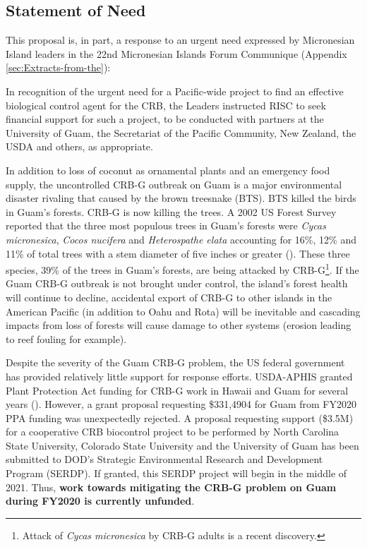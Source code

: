 \documentclass[12pt,letterpaper,english,bibliography=totocnumbered, abstract=on]{scrartcl}
\begin{document}
\subsection{Statement of Need}

This proposal is, in part, a response to an urgent need expressed by Micronesian Island leaders in the 22nd Micronesian Islands Forum Communique (Appendix \ref{sec:Extracts-from-the}):

\begin{framed}
In recognition of the urgent need for a Pacific-wide project to find an effective biological control agent for the CRB, the Leaders instructed RISC to seek financial support for such a project, to be conducted with partners at the University of Guam, the Secretariat of the Pacific Community, New Zealand, the USDA and others, as appropriate.
\end{framed}


In addition to loss of coconut as ornamental plants and an emergency food supply, the uncontrolled CRB-G outbreak on Guam is a major environmental disaster rivaling that caused by the brown treesnake (BTS). BTS killed the birds in Guam's forests. CRB-G is now killing the trees. A 2002 US Forest Survey reported that the three most populous trees in Guam's forests were \textit{Cycas micronesica}, \textit{Cocos nucifera} and \textit{Heterospathe elata}  accounting for 16\%, 12\% and 11\% of total trees with a stem diameter of five inches or greater (\cite{moore_failed_2018-1}). These three species, 39\% of the trees in Guam's forests, are being attacked by CRB-G\footnote{Attack of \textit{Cycas micronesica} by CRB-G adults is a recent discovery.}. If the Guam CRB-G outbreak is not brought under control, the island's forest health  will continue to decline, accidental export of CRB-G to other islands in the American Pacific (in addition to Oahu and Rota) will be inevitable and cascading impacts from loss of forests will cause damage to other systems (erosion leading to reef fouling for example).
  
Despite the severity of the Guam CRB-G problem, the US federal government has provided relatively little support for response efforts. USDA-APHIS granted Plant Protection Act funding for CRB-G work in Hawaii and Guam for several years (\cite{moore_usda_2020}). However, a grant proposal requesting \$331,4904 for Guam from FY2020 PPA funding was unexpectedly rejected. A proposal requesting support (\$3.5M) for a cooperative CRB biocontrol project to be performed by North Carolina State University, Colorado State University and the University of Guam has been submitted to DOD's Strategic Environmental Research and Development Program (SERDP). If granted, this SERDP project will begin in the middle of 2021. Thus, \textbf{work towards mitigating the CRB-G problem on Guam during FY2020 is currently unfunded}.
\end{document}
